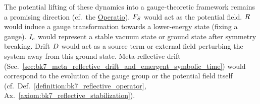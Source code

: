 \begin{remark}
\label{remark:bk7_gauge_theoretic_perspective}
The potential lifting of these dynamics into a gauge-theoretic framework remains a promising direction (cf.~the \hyperref[sec:bk1_operatio]{Operatio}). \(F_S\) would act as the potential field. \(R\) would induce a gauge transformation towards a lower-energy state (fixing a gauge). \(I_c\) would represent a stable vacuum state or ground state after symmetry breaking. Drift \(D\) would act as a source term or external field perturbing the system away from this ground state. Meta-reflective drift (Sec.~\ref{sec:bk7_meta_reflective_drift_and_emergent_symbolic_time}) would correspond to the evolution of the gauge group or the potential field itself (cf.~Def.~\ref{definition:bk7_reflective_operator}, Ax.~\ref{axiom:bk7_reflective_stabilization}).
\end{remark}

